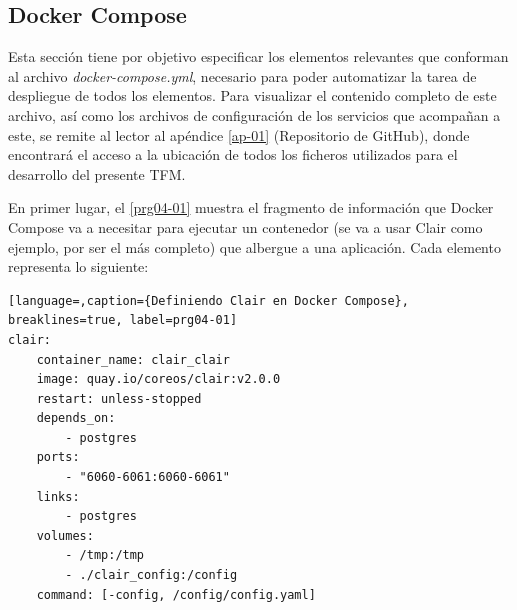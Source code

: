 \subsection{Docker Compose}

Esta sección tiene por objetivo especificar los elementos relevantes que conforman al archivo \mbox{\textit{docker-compose.yml}}, necesario para poder automatizar la tarea de despliegue de todos los elementos. Para visualizar el contenido completo de este archivo, así como los archivos de configuración de los servicios que acompañan a este, se remite al lector al apéndice \autoref{ap-01} (Repositorio de GitHub), donde encontrará el acceso a la ubicación de todos los ficheros utilizados para el desarrollo del presente \gls{TFM}.

En primer lugar, el \autoref{prg04-01} muestra el fragmento de información que Docker Compose va a necesitar para ejecutar un contenedor (se va a usar Clair como ejemplo, por ser el más completo) que albergue a una aplicación. Cada elemento representa lo siguiente:

\begin{lstlisting}[language=,caption={Definiendo Clair en Docker Compose}, breaklines=true, label=prg04-01]
clair:
	container_name: clair_clair
	image: quay.io/coreos/clair:v2.0.0
	restart: unless-stopped
	depends_on:
		- postgres
	ports:
		- "6060-6061:6060-6061"
	links:
		- postgres
	volumes:
		- /tmp:/tmp
		- ./clair_config:/config
	command: [-config, /config/config.yaml]
\end{lstlisting}

